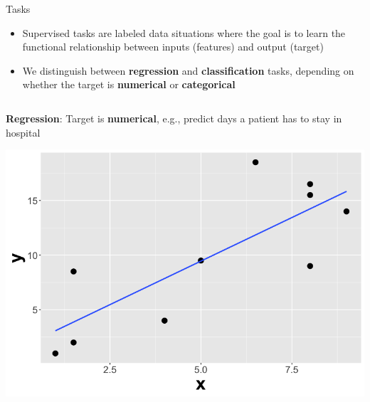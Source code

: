 \documentclass[11pt,compress,t,notes=noshow, xcolor=table]{beamer}
\begin{document}




\begin{vbframe}{Tasks}
\begin{itemize}
    \item Supervised tasks are labeled data situations where the goal is to learn the functional
        relationship between inputs (features) and output (target)

    \item We distinguish between \textbf{regression} and \textbf{classification} tasks, depending on whether the
        target is \textbf{numerical} or \textbf{categorical}
\end{itemize}

\lz

\begin{columns}
\begin{column}{0.4\textwidth}
\small \textbf{Regression}: Target is \textbf{numerical}, e.g., predict days a patient has to stay in hospital

  \begin{center}
    \includegraphics[width=\textwidth]{figure/nutshell-ml-basics-supervised-regression-task.png}
  \end{center}
\end{column}


\end{columns}
\end{vbframe}
\end{document}
